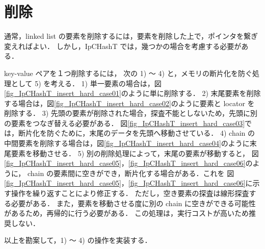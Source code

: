 
\section{削除}

通常，linked list の要素を削除するには，要素を削除した上で，ポインタを繋ぎ変えればよい．
しかし，IpCHashT では，幾つかの場合を考慮する必要がある．

key-value ペアを１つ削除するには，
次の 1) 〜 4) と，メモリの断片化を防ぐ処理として 5) を考える．
1) 単一要素の場合は，図\ref{fig_IpCHashT_insert_hard_case01}のように単に削除する．
2) 末尾要素を削除する場合は，図\ref{fig_IpCHashT_insert_hard_case02}のように要素と locator を削除する．
3) 先頭の要素が削除された場合，探査不能としないため，先頭に別の要素をつなぎ替える必要がある．
図\ref{fig_IpCHashT_insert_hard_case03}では，断片化を防ぐために，末尾のデータを先頭へ移動させている．
4) chain の中間要素を削除する場合は，図\ref{fig_IpCHashT_insert_hard_case04}のように末尾要素を移動させる．
5) 別の削除処理によって，末尾の要素が移動すると，
図\ref{fig_IpCHashT_insert_hard_case05}，\ref{fig_IpCHashT_insert_hard_case06}のように，
chain の要素間に空きができ，断片化する場合がある．これを
図\ref{fig_IpCHashT_insert_hard_case05}，\ref{fig_IpCHashT_insert_hard_case06}に示す操作を繰り返すことにより修正する．
ただし，空き要素の探査は線形探査する必要がある．
また，要素を移動させる度に別の chain に空きができる可能性があるため，再帰的に行う必要がある．
この処理は，実行コストが高いため推奨しない．

以上を勘案して，1) 〜 4) の操作を実装する．

